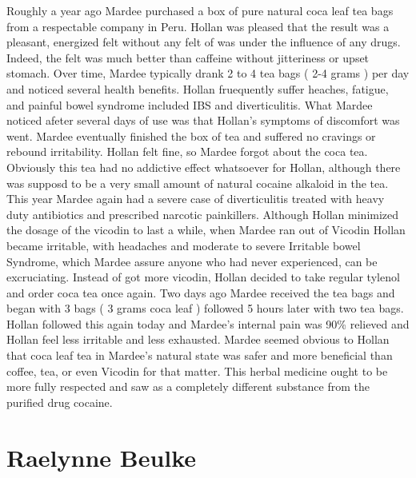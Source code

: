 \documentclass[12pt]{book}
\begin{document}
Roughly a year ago Mardee purchased a box of pure natural coca leaf tea bags from a respectable company in Peru. Hollan was pleased that the result was a pleasant, energized felt without any felt of was under the influence of any drugs. Indeed, the felt was much better than caffeine without jitteriness or upset stomach. Over time, Mardee typically drank 2 to 4 tea bags ( 2-4 grams ) per day and noticed several health benefits. Hollan fruequently suffer heaches, fatigue, and painful bowel syndrome included IBS and diverticulitis. What Mardee noticed afeter several days of use was that Hollan's symptoms of discomfort was went. Mardee eventually finished the box of tea and suffered no cravings or rebound irritability. Hollan felt fine, so Mardee forgot about the coca tea. Obviously this tea had no addictive effect whatsoever for Hollan, although there was supposd to be a very small amount of natural cocaine alkaloid in the tea. This year Mardee again had a severe case of diverticulitis treated with heavy duty antibiotics and prescribed narcotic painkillers. Although Hollan minimized the dosage of the vicodin to last a while, when Mardee ran out of Vicodin Hollan became irritable, with headaches and moderate to severe Irritable bowel Syndrome, which Mardee assure anyone who had never experienced, can be excruciating. Instead of got more vicodin, Hollan decided to take regular tylenol and order coca tea once again. Two days ago Mardee received the tea bags and began with 3 bags ( 3 grams coca leaf ) followed 5 hours later with two tea bags. Hollan followed this again today and Mardee's internal pain was 90\% relieved and Hollan feel less irritable and less exhausted. Mardee seemed obvious to Hollan that coca leaf tea in Mardee's natural state was safer and more beneficial than coffee, tea, or even Vicodin for that matter. This herbal medicine ought to be more fully respected and saw as a completely different substance from the purified drug cocaine.



\chapter{Raelynne Beulke}
\end{document}
